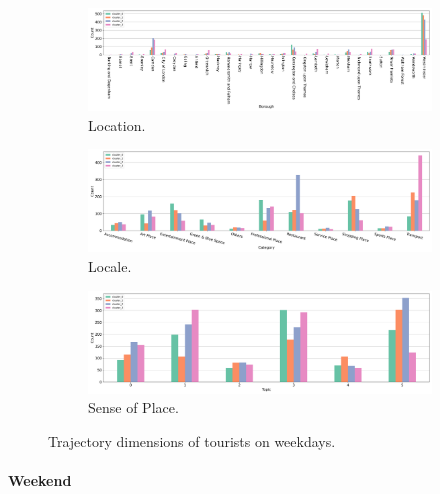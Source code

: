 \documentclass{article}
\newcommand{\subsubsubsection}[1]{\paragraph{#1}\mbox{}\\}
\theoremstyle{remark}
\begin{document}
\begin{figure}[!h]

\centering
\begin{subfigure}{0.6\textheight}
\centering
\includegraphics[width=1\linewidth]{figures/traj_location_weekday_tourists.png}
\caption{Location.}
\label{fig:traj_location_weekday_tourists}
\end{subfigure}
\begin{subfigure}{0.6\textheight}
\centering
\includegraphics[width=1\linewidth]{figures/traj_locale_weekday_tourists.png}
\caption{Locale.}
\label{fig:traj_locale_weekday_tourists}
\end{subfigure}
\begin{subfigure}{0.6\textheight}
\centering
\includegraphics[width=1\linewidth]{figures/traj_sense_weekday_tourists.png}
\caption{Sense of Place.}
\label{fig:traj_sense_weekday_tourists}
\end{subfigure}

\caption{Trajectory dimensions of tourists on weekdays.}
\label{fig:traj_dimension_weekday_tourists}
\end{figure}


\subsubsubsection{Weekend}
\end{document}
